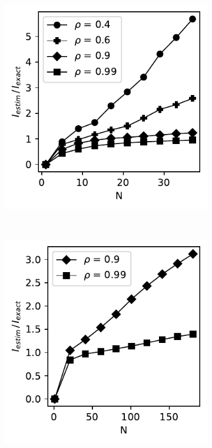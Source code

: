 \documentclass[../Thesis.tex]{subfiles}
\begin{document}
\begin{figure}[h]
\begin{subfigure}[t]{0.32\textwidth}
        \includegraphics[width=\linewidth]{figures/ND examples/MI calc/gaussian example original zoom.pdf}
        \caption{}
        \label{subfig:dd}
    \end{subfigure}%
    ~
    \begin{subfigure}[t]{0.32\textwidth}
        \centering
        \includegraphics[width=\linewidth]{figures/ND examples/MI calc/gaussian example original high corr.pdf}

\end{subfigure}
\end{figure}
\end{document}
